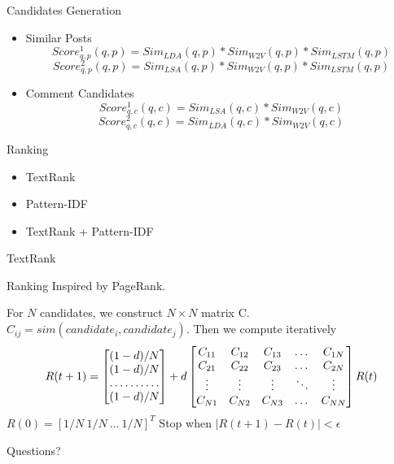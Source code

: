 \documentclass{beamer}
\begin{document}
    \begin{frame}{Candidates Generation}
      \begin{itemize}
      \item Similar Posts
      \begin{equation}
         Score_{q,p}^1(q, p) = Sim_{LDA}(q, p) * Sim_{W2V}(q, p) * Sim_{LSTM}(q, p)
      \end{equation}
      \begin{equation}
         Score_{q,p}^2(q, p) = Sim_{LSA}(q, p) * Sim_{W2V}(q, p) * Sim_{LSTM}(q, p)
      \end{equation}
      \item Comment Candidates
      \begin{equation}
         Score_{q,c}^1(q, c) = Sim_{LSA}(q, c) * Sim_{W2V}(q, c)
      \end{equation}
      \begin{equation}
         Score_{q,c}^2(q, c) = Sim_{LDA}(q, c) * Sim_{W2V}(q, c)
      \end{equation}
    \end{itemize}
    \end{frame}

    \begin{frame}{Ranking}
      \begin{itemize}
        \item TextRank
        \item Pattern-IDF
        \item TextRank + Pattern-IDF
      \end{itemize}
    \end{frame}

    \begin{frame}{TextRank}
    \end{frame}

    \begin{frame}{Ranking}
      Inspired by PageRank. \newline

      For $N$ candidates, we construct $ N \times N $ matrix C. $C_{ij} = sim(candidate_i, candidate_j)$. Then we compute iteratively
      \[
      R(t+1) = 
      \begin{bmatrix}
          (1-d)/N       \\
          (1-d)/N       \\
          \hdotsfor{1} \\
          (1-d)/N       
      \end{bmatrix}
      +d
      \begin{bmatrix}
          C_{11} & C_{12} & C_{13} & \dots  & C_{1N} \\
          C_{21} & C_{22} & C_{23} & \dots  & C_{2N} \\
          \vdots & \vdots & \vdots & \ddots & \vdots \\
          C_{N1} & C_{N2} & C_{N3} & \dots  & C_{NN}
      \end{bmatrix}
      R(t)
      \]
      $R(0) = [1/N \ 1/N \ ... \ 1/N]^T$ \newline
      Stop when $|R(t+1)-R(t)|<\epsilon$
    \end{frame}

  \begin{frame}[standout]
    Questions?
  \end{frame}
\end{document}

